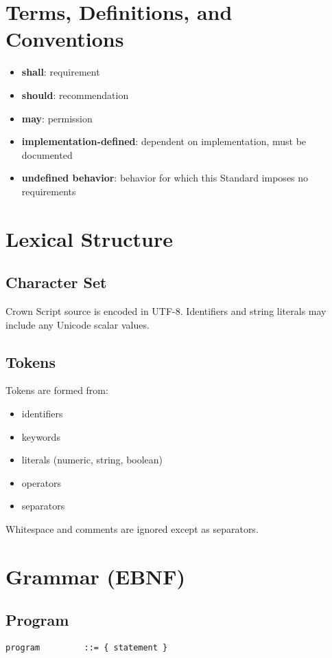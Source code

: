 \documentclass[12pt,a4paper]{article}
\begin{document}
\section{Terms, Definitions, and Conventions}
\begin{itemize}
\item \textbf{shall}: requirement
\item \textbf{should}: recommendation
\item \textbf{may}: permission
\item \textbf{implementation-defined}: dependent on implementation, must be documented
\item \textbf{undefined behavior}: behavior for which this Standard imposes no requirements
\end{itemize}

\section{Lexical Structure}

\subsection{Character Set}
Crown Script source is encoded in UTF-8. Identifiers and string literals may include any Unicode scalar values.

\subsection{Tokens}
Tokens are formed from:
\begin{itemize}
\item identifiers
\item keywords
\item literals (numeric, string, boolean)
\item operators
\item separators
\end{itemize}

Whitespace and comments are ignored except as separators.

\section{Grammar (EBNF)}

\subsection{Program}
\begin{lstlisting}
program         ::= { statement }
\end{lstlisting}
\end{document}
